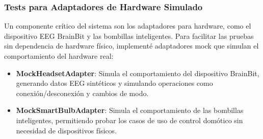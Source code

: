 \begin{table}[ht]
    \centering
    \small
    \caption{Resultados de pruebas unitarias del módulo Core}
    \label{tab:unit_tests_core}
\end{table}

\subsubsection{Tests para Adaptadores de Hardware Simulado}

Un componente crítico del sistema son los adaptadores para hardware, como el dispositivo EEG BrainBit y las bombillas inteligentes. Para facilitar las pruebas sin dependencia de hardware físico, implementé adaptadores mock que simulan el comportamiento del hardware real:

\begin{itemize}
    \item \textbf{MockHeadsetAdapter}: Simula el comportamiento del dispositivo BrainBit, generando datos EEG sintéticos y simulando operaciones como conexión/desconexión y cambios de modo.
    
    \item \textbf{MockSmartBulbAdapter}: Simula el comportamiento de las bombillas inteligentes, permitiendo probar los casos de uso de control domótico sin necesidad de dispositivos físicos.
\end{itemize}

